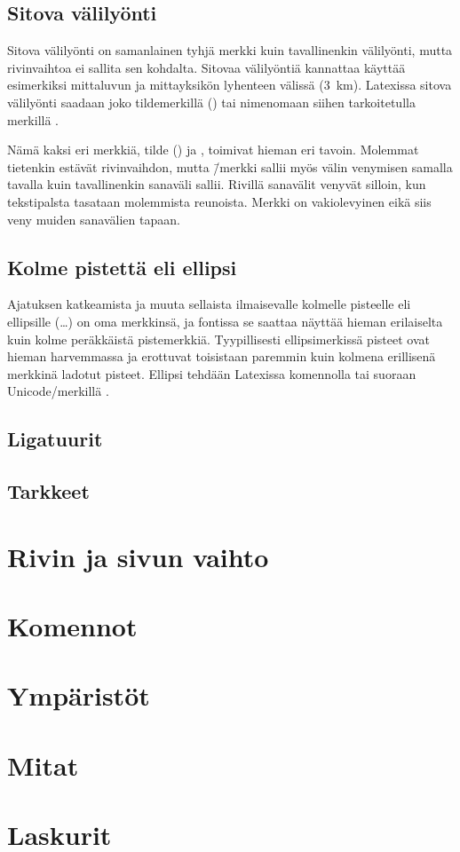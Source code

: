 
\subsection{Sitova välilyönti}

Sitova välilyönti on samanlainen tyhjä merkki kuin tavallinenkin
välilyönti, mutta rivinvaihtoa ei sallita sen kohdalta. Sitovaa
välilyöntiä kannattaa käyttää esimerkiksi mittaluvun ja mittayksikön
lyhenteen välissä (3~km). Latexissa sitova välilyönti saadaan joko
tildemerkillä (\koodi{\textasciitilde}) tai nimenomaan siihen
tarkoitetulla merkillä .

Nämä kaksi eri merkkiä, tilde (\koodi{\textasciitilde}) ja
, toimivat hieman eri tavoin. Molemmat tietenkin estävät
rivinvaihdon, mutta \koodi{\textasciitilde}\=/merkki sallii myös välin
venymisen samalla tavalla kuin tavallinenkin sanaväli sallii. Rivillä
sanavälit venyvät silloin, kun tekstipalsta tasataan molemmista
reunoista. Merkki  on vakiolevyinen eikä siis veny
muiden sanavälien tapaan.

\subsection{Kolme pistettä eli ellipsi}

Ajatuksen katkeamista ja muuta sellaista ilmaisevalle kolmelle pisteelle
eli ellipsille (…) on oma merkkinsä, ja fontissa se saattaa näyttää
hieman erilaiselta kuin kolme peräkkäistä pistemerkkiä. Tyypillisesti
ellipsimerkissä pisteet ovat hieman harvemmassa ja erottuvat toisistaan
paremmin kuin kolmena erillisenä merkkinä ladotut pisteet. Ellipsi
tehdään Latexissa komennolla  tai suoraan
Unicode\-/merkillä .

\subsection{Ligatuurit}
\subsection{Tarkkeet}
\label{luku:tarkkeet}
\section{Rivin ja sivun vaihto}
\section{Komennot}
\label{luku:komennot}
\section{Ympäristöt}
\label{luku:ymparistot}
\section{Mitat}
\section{Laskurit}
